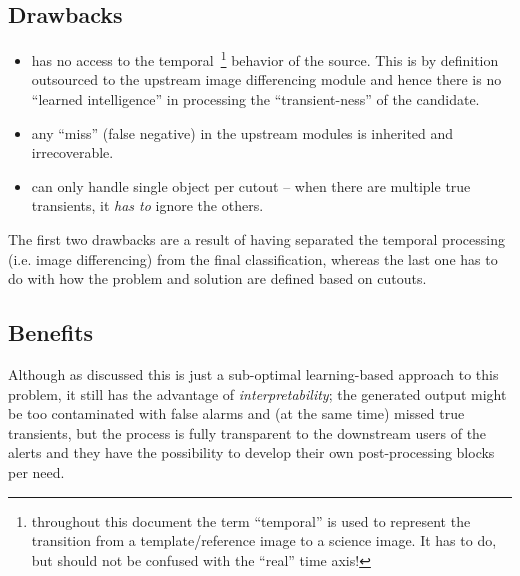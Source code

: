 

\subsection{Drawbacks}
\begin{itemize}
\item has no access to the temporal~\footnote{throughout this document the term ``temporal'' is used to represent the transition from a template/reference image to a science image. It has to do, but should not be confused with the ``real'' time axis!} behavior of the source. This is by definition outsourced to the upstream image differencing module and hence there is no ``learned intelligence'' in processing the ``transient-ness'' of the candidate.
\item any ``miss'' (false negative) in the upstream modules is inherited and irrecoverable.
\item can only handle single object per cutout -- when there are multiple true transients, it \emph{has to} ignore the others.
\end{itemize}

The first two drawbacks are a result of having separated the temporal processing (i.e. image differencing) from the final classification, whereas the last one has to do with how the problem and solution are defined based on cutouts.



\subsection{Benefits}
\label{sec:rb_benefits}

Although as discussed this is just a sub-optimal learning-based approach to this problem, it still has the advantage of \emph{interpretability}; the generated output might be too contaminated with false alarms and (at the same time) missed true transients, but the process is fully transparent to the downstream users of the alerts and they have the possibility to develop their own post-processing blocks per need.


